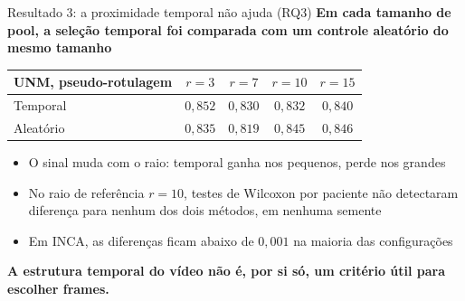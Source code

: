 \documentclass[aspectratio=169]{beamer}
\begin{document}
\begin{frame}{Resultado 3: a proximidade temporal não ajuda (RQ3)}
  \vspace{0.3em}
  \textbf{Em cada tamanho de pool, a seleção temporal foi comparada com um controle aleatório do mesmo tamanho}

  \bigskip
  \centering
  \footnotesize
  \begin{tabular}{@{}lcccc@{}}
    \toprule
    \textbf{UNM, pseudo-rotulagem} & $r{=}3$ & $r{=}7$ & $r{=}10$ & $r{=}15$ \\
    \midrule
    Temporal   & $0,852$ & $0,830$ & $0,832$ & $0,840$ \\
    Aleatório  & $0,835$ & $0,819$ & $0,845$ & $0,846$ \\
    \bottomrule
  \end{tabular}

  \bigskip
  \raggedright
  \begin{itemize}\footnotesize
    \item O sinal muda com o raio: temporal ganha nos pequenos, perde nos grandes
    \item No raio de referência $r{=}10$, testes de Wilcoxon por paciente não detectaram diferença para nenhum dos dois métodos, em nenhuma semente
    \item Em INCA, as diferenças ficam abaixo de $0{,}001$ na maioria das configurações
  \end{itemize}

  \medskip
  \footnotesize\textbf{A estrutura temporal do vídeo não é, por si só, um critério útil para escolher frames.}

\end{frame}
\end{document}
